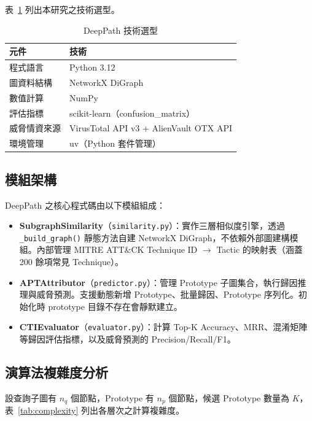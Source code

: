 \begin{ZhChapter}
表~\ref{tab:tech-stack} 列出本研究之技術選型。

\begin{table}[htbp]
    \centering
    \caption{DeepPath 技術選型}
    \label{tab:tech-stack}
    \renewcommand\arraystretch{1.2}
    \begin{tabular}{l l}
        \hline
        \textbf{元件} & \textbf{技術} \\
        \hline
        程式語言 & Python 3.12 \\
        圖資料結構 & NetworkX DiGraph \\
        數值計算 & NumPy \\
        評估指標 & scikit-learn（confusion\_matrix） \\
        威脅情資來源 & VirusTotal API v3 + AlienVault OTX API \\
        環境管理 & uv（Python 套件管理） \\
        \hline
    \end{tabular}
\end{table}

\subsection{模組架構}

DeepPath 之核心程式碼由以下模組組成：
\begin{itemize}
    \item \textbf{SubgraphSimilarity}（\texttt{similarity.py}）：實作三層相似度引擎，透過 \texttt{\_build\_graph()} 靜態方法自建 NetworkX DiGraph，不依賴外部圖建構模組。內部管理 MITRE ATT\&CK Technique ID $\rightarrow$ Tactic 的映射表（涵蓋 200 餘項常見 Technique）。
    \item \textbf{APTAttributor}（\texttt{predictor.py}）：管理 Prototype 子圖集合，執行歸因推理與威脅預測。支援動態新增 Prototype、批量歸因、Prototype 序列化。初始化時 prototype 目錄不存在會靜默建立。
    \item \textbf{CTIEvaluator}（\texttt{evaluator.py}）：計算 Top-K Accuracy、MRR、混淆矩陣等歸因評估指標，以及威脅預測的 Precision/Recall/F1。
\end{itemize}

\subsection{演算法複雜度分析}
\label{subsec:complexity}

設查詢子圖有 $n_q$ 個節點，Prototype 有 $n_p$ 個節點，候選 Prototype 數量為 $K$，表~\ref{tab:complexity} 列出各層次之計算複雜度。


\end{ZhChapter}
